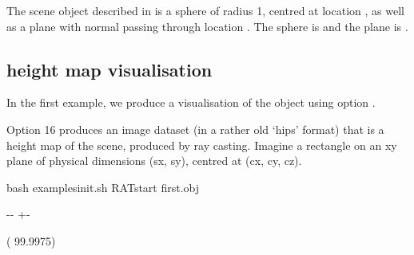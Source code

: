 \documentclass[letterpaper,10pt,english]{sphinxmanual}
\newlength\nbsphinxcodecellspacing
\begin{document}
The scene object described in  is a sphere of radius 1, centred at location , as well as a plane with normal  passing through location . The sphere is  and the plane is .


\subsection{height map visualisation}
\label{\detokenize{RATstart:height-map-visualisation}}
In the first example, we produce a visualisation of the object using option .

\begin{sphinxVerbatim}[commandchars=\\\{\}]
                
\end{sphinxVerbatim}

Option 16 produces an image dataset (in a rather old ‘hips’ format) that is a height map of the scene, produced by ray casting. Imagine a rectangle on an x\sphinxhyphen{}y plane of physical dimensions (sx, sy), centred at (cx, cy, cz).

{
\begin{sphinxVerbatim}[commandchars=\\\{\}]
\llap{\color{nbsphinxin}[15]:\,\hspace{\fboxrule}\hspace{\fboxsep}}\PYGZpc{}\PYGZpc{}bash
 examples\PYGZus{}init.sh
RATstart first.obj 
\end{sphinxVerbatim}
}

{

\kern-\sphinxverbatimsmallskipamount\kern-\baselineskip
\kern+\FrameHeightAdjust\kern-\fboxrule
\vspace{\nbsphinxcodecellspacing}

\begin{sphinxVerbatim}[commandchars=\\\{\}]
( 99.9975)
\end{sphinxVerbatim}
}
\end{document}
